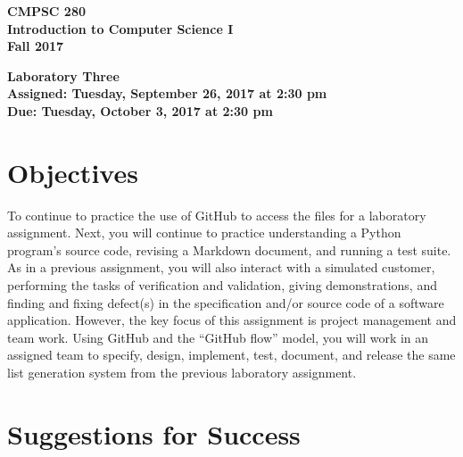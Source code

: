 \documentclass[11pt]{article}
\newcommand{\assignmentduedate}{October 3}
\newcommand{\assignmentassignedate}{September 26}
\newcommand{\assignmentnumber}{Three}
\newcommand{\labyear}{2017}
\newcommand{\labday}{Tuesday}
\newcommand{\labtime}{2:30 pm}
\newcommand{\assigneddate}{Assigned: \labday, \assignmentassignedate, \labyear{} at \labtime{}}
\newcommand{\duedate}{Due: \labday, \assignmentduedate, \labyear{} at \labtime{}}
\newcommand{\labtitle}[1]
{
  \begin{center}
    \begin{center}
      \bf
      CMPSC 280\\Introduction to Computer Science I\\
      Fall 2017\\
      \medskip
    \end{center}
    \bf
    #1
  \end{center}
}
\begin{document}
\thispagestyle{empty}

\labtitle{Laboratory \assignmentnumber{} \\ \assigneddate{} \\ \duedate{}}

\section*{Objectives}

To continue to practice the use of GitHub to access the files for a laboratory assignment. Next, you will continue to
practice understanding a Python program's source code, revising a Markdown document, and running a test suite. As in a
previous assignment, you will also interact with a simulated customer, performing the tasks of verification and
validation, giving demonstrations, and finding and fixing defect(s) in the specification and/or source code of a
software application. However, the key focus of this assignment is project management and team work. Using GitHub and
the ``GitHub flow'' model, you will work in an assigned team to specify, design, implement, test, document, and release
the same list generation system from the previous laboratory assignment.

\section*{Suggestions for Success}
\end{document}
